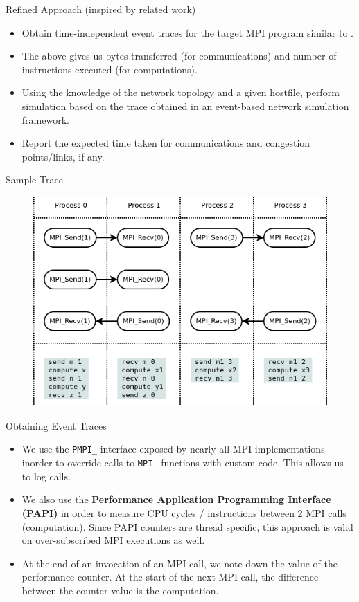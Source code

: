 \documentclass[pdf]{beamer}
\begin{document}
\begin{frame}{Refined Approach (inspired by related work)}
  \begin{itemize}
    \item<1-> Obtain time-independent event traces for the target MPI program
      similar to \cite{time-independent-trace-sim}.
    \item<2-> The above gives us bytes transferred (for communications) and
      number of instructions executed (for computations).
    \item<3-> Using the knowledge of the network topology and a given hostfile,
      perform simulation based on the trace obtained in an event-based network
      simulation framework.
    \item<4-> Report the expected time taken for communications and congestion
      points/links, if any.
  \end{itemize}
\end{frame}
\begin{frame}{Sample Trace}
  \begin{figure}[ht]
    \begin{center}
      \includegraphics[width=\textwidth]{ti-trace}
    \end{center}
  \end{figure}
\end{frame}
\begin{frame}{Obtaining Event Traces}
  \begin{itemize}
    \item<1-> We use the \texttt{PMPI\_} interface exposed by nearly all MPI
      implementations inorder to override calls to \texttt{MPI\_} functions with
      custom code. This allows us to log calls.
    \item<2-> We also use the \textbf{Performance Application Programming
        Interface (PAPI)} \cite{papi} in order to measure CPU cycles /
      instructions between 2 MPI calls (computation). Since PAPI counters are
      thread specific, this approach is valid on over-subscribed MPI executions
      as well.
    \item<3-> At the end of an invocation of an MPI call, we note down the value
      of the performance counter. At the start of the next MPI call, the
      difference between the counter value is the computation.
  \end{itemize}
\end{frame}
\end{document}
